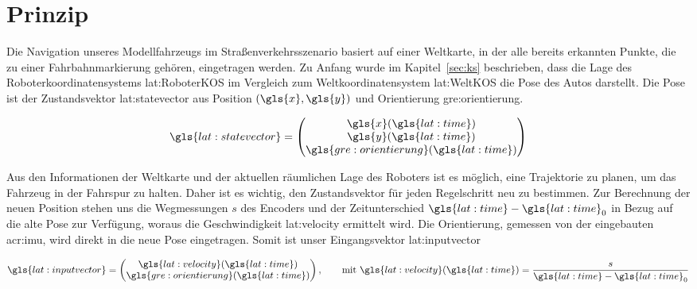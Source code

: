\section{Prinzip}

Die Navigation unseres Modellfahrzeugs im Straßenverkehrsszenario basiert auf einer Weltkarte, in der alle bereits erkannten Punkte, die zu einer Fahrbahnmarkierung gehören, eingetragen werden. Zu Anfang wurde im Kapitel~\ref{sec:ks} beschrieben, dass die Lage des Roboterkoordinatensystems \gls{lat:RoboterKOS} im Vergleich zum Weltkoordinatensystem \gls{lat:WeltKOS} die Pose des Autos darstellt. Die Pose ist der Zustandsvektor \gls{lat:statevector} aus Position \( (\gls{x},\gls{y}) \) und Orientierung \gls{gre:orientierung}.

\begin{equation}
\gls{lat:statevector} = 
\begin{pmatrix}
\gls{x}(\gls{lat:time}) 	\\
\gls{y}(\gls{lat:time})	\\
\gls{gre:orientierung}(\gls{lat:time})    	\\
\end{pmatrix}
\label{eq:regelung_prinzip_pose}
\end{equation} 

 Aus den Informationen der Weltkarte und der aktuellen räumlichen Lage des Roboters ist es möglich, eine Trajektorie zu planen, um das Fahrzeug in der Fahrspur zu halten. Daher ist es wichtig, den Zustandsvektor für jeden Regelschritt neu zu bestimmen. Zur Berechnung der neuen Position stehen uns die Wegmessungen \(s\) des Encoders und der Zeitunterschied \(\gls{lat:time}-{\gls{lat:time}}_0\) in Bezug auf die alte Pose zur Verfügung, woraus die Geschwindigkeit \gls{lat:velocity} ermittelt wird. Die Orientierung, gemessen von der eingebauten \gls{acr:imu}, wird direkt in die neue Pose eingetragen. Somit ist unser Eingangsvektor \gls{lat:inputvector}
 
\begin{equation}
\gls{lat:inputvector} = 
\begin{pmatrix}
\gls{lat:velocity}(\gls{lat:time}) 			\\
\gls{gre:orientierung}(\gls{lat:time})    	\\
\end{pmatrix}
, \qquad \text{mit }
\gls{lat:velocity}(\gls{lat:time}) = \frac{s}{\gls{lat:time}-{\gls{lat:time}}_0}
\end{equation} 
 

